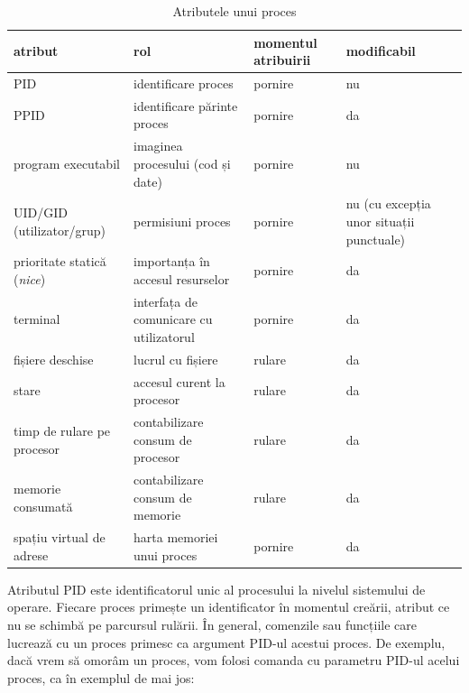\begin{table}[!htb]
\caption{Atributele unui proces}
\begin{center}
  \begin{tabular}{ p{} p{} p{} p{}  }
	\toprule
                \textbf{atribut} & \textbf{rol} & \textbf{momentul atribuirii} & \textbf{modificabil} \\
	\midrule
                PID & identificare proces & pornire & nu \\
	\midrule
                PPID & identificare părinte proces & pornire & da \\
	\midrule
                program executabil & imaginea procesului (cod și date) & pornire & nu \\
	\midrule
                UID/GID (utilizator/grup) & permisiuni proces & pornire & nu (cu excepția unor situații punctuale) \\
	\midrule
                prioritate statică (\textit{nice}) & importanța în accesul resurselor & pornire & da \\
        \midrule
                terminal & interfața de comunicare cu utilizatorul & pornire & da \\
        \midrule
                fișiere deschise & lucrul cu fișiere & rulare & da \\
        \midrule
                stare & accesul curent la procesor & rulare & da \\
        \midrule
                timp de rulare pe procesor & contabilizare consum de procesor & rulare & da \\
        \midrule
                memorie consumată & contabilizare consum de memorie & rulare & da \\
        \midrule
                spațiu virtual de adrese & harta memoriei unui proces & pornire & da \\
	\bottomrule
	\end{tabular}
        \label{table:process-attributes}
\end{center}
\end{table}

Atributul PID este identificatorul unic al procesului la nivelul sistemului de
operare. Fiecare proces primește un identificator în momentul creării, atribut
ce nu se schimbă pe parcursul rulării. În general, comenzile sau funcțiile care
lucrează cu un proces primesc ca argument PID-ul acestui proces. De exemplu,
dacă vrem să omorâm un proces, vom folosi comanda  cu parametru PID-ul
acelui proces, ca în exemplul de mai jos:

